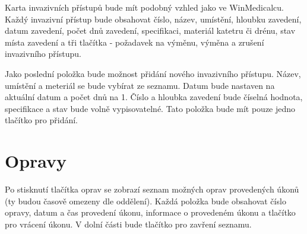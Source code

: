 Karta invazivních přístupů bude mít podobný vzhled jako ve WinMedicalcu. Každý invazivní přístup bude obsahovat číslo, název, umístění, hloubku zavedení, datum zavedení, počet dnů zavedení, specifikaci, materiál katetru či drénu, stav místa zavedení a tři tlačítka - požadavek na výměnu, výměna a zrušení invazivního přístupu.

Jako poslední položka bude možnost přidání nového invazivního přístupu. Název, umístění a meteriál se bude vybírat ze seznamu. Datum bude nastaven na aktuální datum a počet dnů na 1. Číslo a hloubka zavedení bude číselná hodnota, specifikace a stav bude volně vypisovatelné. Tato položka bude mít pouze jedno tlačítko pro přidání.

\section{Opravy}

Po stisknutí tlačítka oprav se zobrazí seznam možných oprav provedených úkonů (ty budou časově omezeny dle oddělení). Každá položka bude obsahovat číslo opravy, datum a čas provedení úkonu, informace o provedeném úkonu a tlačítko pro vrácení úkonu. V dolní části bude tlačítko pro zavření seznamu.